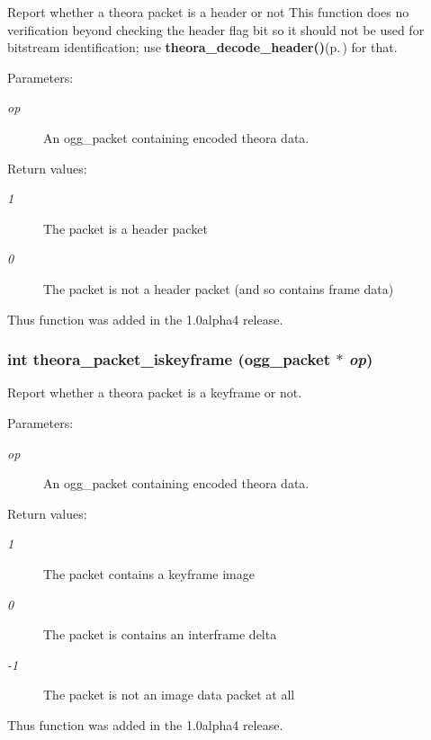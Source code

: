 Report whether a theora packet is a header or not This function does no verification beyond checking the header flag bit so it should not be used for bitstream identification; use {\bf theora\_\-decode\_\-header()}{\rm (p.\,\pageref{theora_8h_41a60c67649c41ae88278d777f89ee3f})} for that. 

\begin{Desc}
\item[Parameters:]
\begin{description}
\item[{\em op}]An ogg\_\-packet containing encoded theora data. \end{description}
\end{Desc}
\begin{Desc}
\item[Return values:]
\begin{description}
\item[{\em 1}]The packet is a header packet \item[{\em 0}]The packet is not a header packet (and so contains frame data)\end{description}
\end{Desc}
Thus function was added in the 1.0alpha4 release. 
\subsubsection{\setlength{\rightskip}{0pt plus 5cm}int theora\_\-packet\_\-iskeyframe (ogg\_\-packet $\ast$ {\em op})}\label{theora_8h_88a636ebe2e390aa0ca6bb547912814f}


Report whether a theora packet is a keyframe or not. 

\begin{Desc}
\item[Parameters:]
\begin{description}
\item[{\em op}]An ogg\_\-packet containing encoded theora data. \end{description}
\end{Desc}
\begin{Desc}
\item[Return values:]
\begin{description}
\item[{\em 1}]The packet contains a keyframe image \item[{\em 0}]The packet is contains an interframe delta \item[{\em -1}]The packet is not an image data packet at all\end{description}
\end{Desc}
Thus function was added in the 1.0alpha4 release. 

